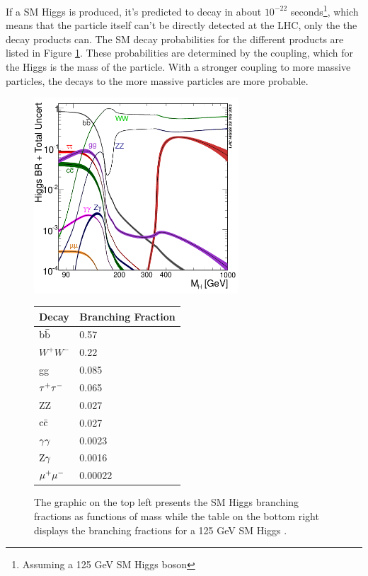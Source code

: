 \documentclass[12pt]{article}
\begin{document}
If a SM Higgs is produced, it's predicted to decay in about $10^{-22}$ seconds\footnote{Assuming a 125 GeV SM Higgs boson}, which means that the particle itself can't be directly detected at the LHC, only the the decay products can. The SM decay probabilities for the different products are listed in Figure \ref{fig:hbranch}. These probabilities are determined by the coupling, which for the Higgs is the mass of the particle. With a stronger coupling to more massive particles, the decays to the more massive particles are more probable.
\begin{figure}[h!]
  \centering
  \includegraphics[width=3in]{images/Higgs_BR.png}
  \begin{tabular}{ ll }
    \hline
    Decay & Branching Fraction \\
    \hline
    ${\rm b\bar{b}}$ & 0.57 \\
    $W^+W^-$ & 0.22\\
    gg & 0.085 \\
    ${\rm \tau^+\tau^-}$ & 0.065 \\
    ZZ & 0.027 \\
    ${\rm c\bar{c}}$ & 0.027 \\
    ${\rm \gamma\gamma}$ & 0.0023 \\
    ${\rm Z}\gamma$ & 0.0016 \\
    ${\rm \mu^{+}\mu^{-}}$ & 0.00022 \\
    \hline
  \end{tabular} 
  \caption
{The graphic on the top left presents the SM Higgs branching fractions as functions of mass while the table on the bottom right displays the branching fractions for a 125 GeV SM Higgs \cite{crossbranchplots}.}
  \label{fig:hbranch}
\end{figure}
\end{document}
